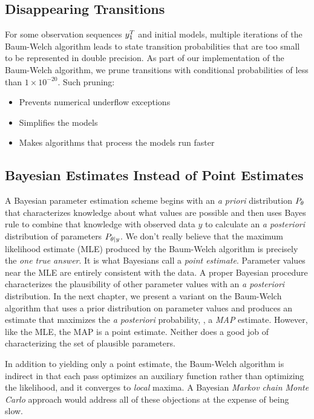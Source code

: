 \subsection{Disappearing Transitions}
\label{sec:disappear}

For some observation sequences $y_{1}^{T}$ and initial models,
multiple iterations of the Baum-Welch algorithm leads to state
transition probabilities that are too small to be represented in
double precision.  As part of our implementation of the Baum-Welch
algorithm, we prune transitions with conditional probabilities of less
than $1\times 10^{-20}$.  Such pruning:
\begin{itemize}
\item Prevents numerical underflow exceptions
\item Simplifies the models
\item Makes algorithms that process the models run faster
\end{itemize}

\subsection{Bayesian Estimates Instead of Point Estimates}
\label{sec:EstWholeDist}

A Bayesian parameter estimation scheme begins with an \emph{a priori}
distribution $P_{\theta}$ that characterizes knowledge about what
values are possible and then uses Bayes rule to combine that knowledge
with observed data $y$ to calculate an \emph{a posteriori}
distribution of parameters $P_{\theta|y}$.  We don't really
believe that the maximum likelihood estimate (MLE) produced by the
Baum-Welch algorithm is precisely the \emph{one true answer}.  It is
what Bayesians call a \emph{point estimate}.  Parameter values near
the MLE are entirely consistent with the data.  A proper Bayesian
procedure characterizes the plausibility of other parameter values
with an \emph{a posteriori} distribution.  In the next chapter, we
present a variant on the Baum-Welch algorithm that uses a prior
distribution on parameter values and produces an estimate that
maximizes the \emph{a posteriori} probability, \ie, a \emph{MAP}
estimate.  However, like the MLE, the MAP is a point estimate.
Neither does a good job of characterizing the set of plausible
parameters.

In addition to yielding only a point estimate, the Baum-Welch
algorithm is indirect in that each pass optimizes an auxiliary
function rather than optimizing the likelihood, and it converges to
\emph{local} maxima.  A Bayesian \emph{Markov chain Monte Carlo}
approach would address all of these objections at the expense of being
slow.

